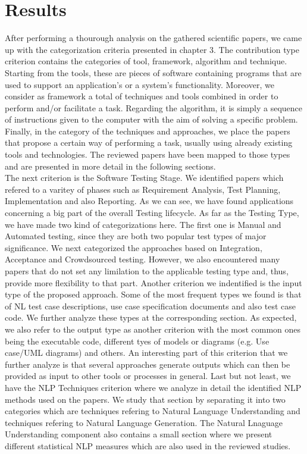 \chapter{Results}

After performing a thourough analysis on the gathered scientific papers, we came up with the categorization criteria presented in chapter 3. The contribution type criterion contains the categories 
of tool, framework, algorithm and technique. Starting from the tools, these are pieces of software containing programs that are used to support an application's or a system's functionality. 
Moreover, we consider as framework a total of techniques and tools combined in order to perform and/or facilitate a task. Regarding the algorithm, it is simply a sequence of instructions given 
to the computer with the aim of solving a specific problem. Finally, in the category of the techniques and approaches, we place the papers that propose a certain way of performing a task, usually 
using already existing tools and technologies. The reviewed papers have been mapped to those types and are presented in more detail in the following sections. \\

The next criterion is the Software Testing Stage. We identified papers which refered to a varitey of phases such as Requirement Analysis, Test Planning, Implementation and also 
Reporting. As we can see, we have found applications concerning a big part of the overall Testing lifecycle. As far as the Testing Type, we have made two kind of categorizations here. 
The first one is Manual and Automated testing, since they are both two popular test types of major significance. We next categorized the approaches based on Integration, Acceptance and Crowdsourced testing. 
However, we also encountered many papers that do not set any limilation to the applicable testing type and, thus, provide more flexibility to that part. Another criterion we indentified is the input type of 
the proposed approach. Some of the most frequent types we found is that of NL test case descriptions, use case specification documents and also test case code. We further analyze these types at the 
corresponding section. As expected, we also refer to the output type as another criterion with the most common ones being the executable code, different tyes of models or diagrams (e.g. Use case/UML diagrams) and 
others. An interesting part of this criterion that we further analyze is that several approaches generate outputs which can then be provided as input to other tools or processes in general. Last but not least, we 
have the NLP Techniques criterion where we analyze in detail the identified NLP methods used on the papers. We study that section by separating it into two categories which are techniques refering to Natural 
Language Understanding and techniques refering to Natural Language Generation. The Natural Lnaguage Understanding component also contains a small section where we present different statistical NLP measures which 
are also used in the reviewed studies.\\

